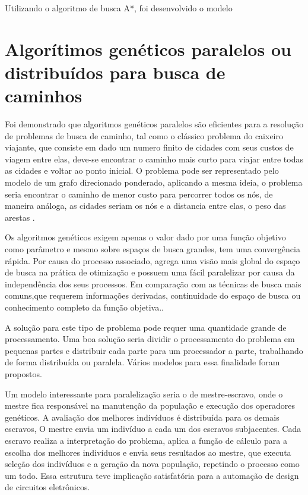 Utilizando o algoritmo de busca A*, foi desenvolvido o modelo

\section{Algorítimos genéticos paralelos ou distribuídos para busca de caminhos}

Foi demonstrado que algoritmos genéticos paralelos são eficientes para a resolução de problemas de busca de caminho, tal como o clássico problema do caixeiro viajante, que consiste em dado um numero finito de cidades com seus custos de viagem entre elas, deve-se encontrar o caminho mais curto para viajar entre todas as cidades e voltar ao ponto inicial. O problema pode ser representado pelo modelo de um grafo direcionado ponderado, aplicando a mesma ideia, o problema seria encontrar o caminho de menor custo para percorrer todos os nós, de maneira análoga, as cidades seriam os nós e a distancia entre elas, o peso das arestas \cite{Jason}\cite{Alaoui}\cite{Heinz}.

Os algoritmos genéticos exigem apenas o valor dado por uma função objetivo como parâmetro e mesmo sobre espaços de busca grandes, tem uma convergência rápida. Por causa do processo associado, agrega uma visão mais global do espaço de busca na prática de otimização e possuem uma fácil paralelizar por causa da independência dos seus processos. Em comparação com as técnicas de busca mais comuns,que requerem informações derivadas, continuidade do espaço de busca ou conhecimento completo da função objetiva.\cite{Vilson}.

A solução para este tipo de problema pode requer uma quantidade grande de processamento. Uma boa solução seria dividir o processamento do problema em pequenas partes e distribuir cada parte para um processador a parte, trabalhando de forma distribuída ou paralela. Vários modelos para essa finalidade foram propostos.

Um modelo interessante para paralelização seria o de mestre-escravo, onde o mestre fica responsável na manutenção da população e execução dos operadores genéticos. A avaliação dos melhores indivíduos é distribuída para os demais escravos, O mestre envia um indivíduo a cada um dos escravos subjacentes. Cada escravo realiza a interpretação do problema, aplica a função de cálculo para a escolha dos melhores indivíduos e envia seus resultados ao mestre, que executa seleção dos indivíduos e a geração da nova população, repetindo o processo como um todo. Essa estrutura teve implicação satisfatória para a automação de design de circuitos eletrônicos. \cite{Jason}

